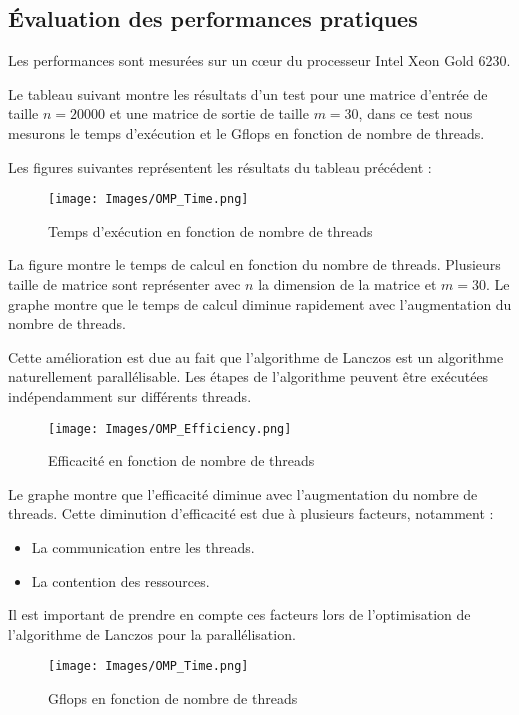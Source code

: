 \documentclass[11pt,french]{article}
\begin{document}
	\subsection{Évaluation des performances pratiques}
    Les performances sont mesurées sur un cœur du processeur Intel Xeon Gold 6230.

    Le tableau suivant montre les résultats d'un test pour une matrice d'entrée de taille $n=20000$ et une matrice de sortie de taille $m=30$, dans ce test nous mesurons le temps d'exécution et le Gflops en fonction de nombre de threads.
    
    Les figures suivantes représentent les résultats du tableau précédent :
    \begin{figure}[h]
    \centering
    \texttt{[image: Images/OMP\_Time.png]}
    \caption{Temps d'exécution en fonction de nombre de threads}
    \label{fig:mesh1}
    \end{figure}
    \FloatBarrier
    
    La figure montre le temps de calcul en fonction du nombre de threads. Plusieurs taille de matrice sont représenter avec $n$ la dimension de la matrice et $m = 30$. Le graphe montre que le temps de calcul diminue rapidement avec l'augmentation du nombre de threads.
    
    Cette amélioration est due au fait que l'algorithme de Lanczos est un algorithme naturellement parallélisable. Les étapes de l'algorithme peuvent être exécutées indépendamment sur différents threads.
    \begin{figure}[h]
    \centering
    \texttt{[image: Images/OMP\_Efficiency.png]}
    \caption{Efficacité en fonction de nombre de threads}
    \label{fig:mesh1}
    \end{figure}
    \FloatBarrier
    
    Le graphe montre que l'efficacité diminue avec l'augmentation du nombre de threads. Cette diminution d'efficacité est due à plusieurs facteurs, notamment :
    \begin{itemize}
        \item La communication entre les threads.
        \item La contention des ressources.
    \end{itemize}
    
    Il est important de prendre en compte ces facteurs lors de l'optimisation de l'algorithme de Lanczos pour la parallélisation.
    \begin{figure}[h]
    \centering
    \texttt{[image: Images/OMP\_Time.png]}
    \caption{Gflops en fonction de nombre de threads}
    \label{fig:mesh1}
    \end{figure}
    \FloatBarrier
    
\end{document}

